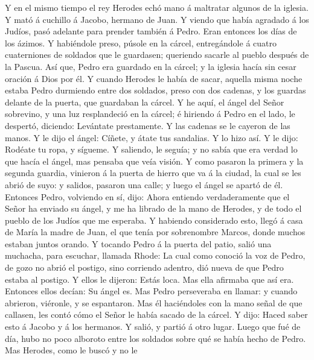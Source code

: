  Y en el mismo tiempo el rey Herodes echó mano á maltratar
algunos de la iglesia.  Y mató á cuchillo á Jacobo,
hermano de Juan.  Y viendo que había agradado á los
Judíos, pasó adelante para prender también á Pedro. Eran entonces los
días de los ázimos.  Y habiéndole preso, púsole en la
cárcel, entregándole á cuatro cuaterniones de soldados que le guardasen;
queriendo sacarle al pueblo después de la Pascua.  Así
que, Pedro era guardado en la cárcel; y la iglesia hacía sin cesar
oración á Dios por él.  Y cuando Herodes le había de
sacar, aquella misma noche estaba Pedro durmiendo entre dos soldados,
preso con dos cadenas, y los guardas delante de la puerta, que guardaban
la cárcel.  Y he aquí, el ángel del Señor sobrevino, y una
luz resplandeció en la cárcel; é hiriendo á Pedro en el lado, le
despertó, diciendo: Levántate prestamente. Y las cadenas se le cayeron
de las manos.  Y le dijo el ángel: Cíñete, y átate tus
sandalias. Y lo hizo así. Y le dijo: Rodéate tu ropa, y sígueme.
 Y saliendo, le seguía; y no sabía que era verdad lo que
hacía el ángel, mas pensaba que veía visión.  Y como
pasaron la primera y la segunda guardia, vinieron á la puerta de hierro
que va á la ciudad, la cual se les abrió de suyo: y salidos, pasaron una
calle; y luego el ángel se apartó de él.  Entonces Pedro,
volviendo en sí, dijo: Ahora entiendo verdaderamente que el Señor ha
enviado su ángel, y me ha librado de la mano de Herodes, y de todo el
pueblo de los Judíos que me esperaba.  Y habiendo
considerado esto, llegó á casa de María la madre de Juan, el que tenía
por sobrenombre Marcos, donde muchos estaban juntos orando.
 Y tocando Pedro á la puerta del patio, salió una
muchacha, para escuchar, llamada Rhode:  La cual como
conoció la voz de Pedro, de gozo no abrió el postigo, sino corriendo
adentro, dió nueva de que Pedro estaba al postigo.  Y
ellos le dijeron: Estás loca. Mas ella afirmaba que así era. Entonces
ellos decían: Su ángel es.  Mas Pedro perseveraba en
llamar: y cuando abrieron, viéronle, y se espantaron. 
Mas él haciéndoles con la mano señal de que callasen, les contó cómo el
Señor le había sacado de la cárcel. Y dijo: Haced saber esto á Jacobo y
á los hermanos. Y salió, y partió á otro lugar.  Luego
que fué de día, hubo no poco alboroto entre los soldados sobre qué se
había hecho de Pedro.  Mas Herodes, como le buscó y no le
